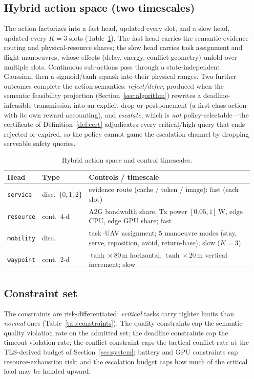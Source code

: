 \subsection{Hybrid action space (two timescales)}
The action factorizes into a fast head, updated every slot, and a slow
head, updated every $K=3$ slots (Table~\ref{tab:action}). The fast head
carries the semantic-evidence routing and physical-resource shares; the
slow head carries task assignment and flight manoeuvres, whose effects
(delay, energy, conflict geometry) unfold over multiple slots. Continuous
sub-actions pass through a state-independent Gaussian, then a
sigmoid/tanh squash into their physical ranges. Two further outcomes
complete the action semantics: \emph{reject/defer}, produced when the
semantic feasibility projection (Section~\ref{sec:algorithm}) rewrites a
deadline-infeasible transmission into an explicit drop or postponement
(a first-class action with its own reward accounting), and
\emph{escalate}, which is \emph{not} policy-selectable---the certificate
of Definition~\ref{def:cert} adjudicates every critical/high query that
ends rejected or expired, so the policy cannot game the escalation channel
by dropping serveable safety queries.

\begin{table}[t]
\centering
\caption{Hybrid action space and control timescales.}
\label{tab:action}
\footnotesize
\setlength{\tabcolsep}{3pt}
\begin{tabular}{@{}>{\raggedright\arraybackslash}p{1.35cm}>{\raggedright\arraybackslash}p{1.02cm}>{\raggedright\arraybackslash}p{4.53cm}@{}}
\toprule
Head & Type & Controls / timescale \\
\midrule
\texttt{service} & disc.\ $\{0,1,2\}$ & evidence route (cache / token / image); fast (each slot) \\
\texttt{resource} & cont.\ $4$-d & A2G bandwidth share, Tx power $[0.05,1]$\,W, edge CPU, edge GPU share; fast \\
\texttt{mobility} & disc. & task--UAV assignment; $5$ manoeuvre modes (stay, serve, reposition, avoid, return-base); slow ($K{=}3$) \\
\texttt{waypoint} & cont.\ $2$-d & $\tanh\!\times\!80$\,m horizontal, $\tanh\!\times\!20$\,m vertical increment; slow \\
\bottomrule
\end{tabular}
\end{table}

\subsection{Constraint set}
The constraints are risk-differentiated: \emph{critical} tasks carry
tighter limits than \emph{normal} ones (Table~\ref{tab:constraints}). The
quality constraints cap the semantic-quality violation rate on the
admitted set; the deadline constraints cap the timeout-violation rate; the
conflict constraint caps the tactical conflict rate at the TLS-derived
budget of Section~\ref{sec:system}; battery and GPU constraints cap
resource-exhaustion risk; and the escalation budget caps how much of the
critical load may be handed upward.

